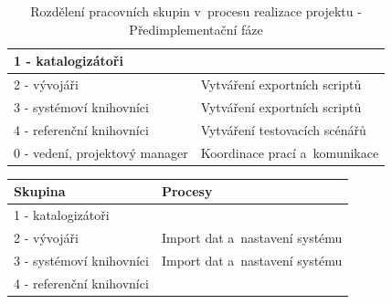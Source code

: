 \documentclass[
	11pt, oneside, printed, final, palatino, monochrome
	microtype,
	table,   %
	lof,     %
	lot     %
]{fithesis3}
\newcommand{\bold}[1]{\textbf{#1}}
\begin{document}
{\begin{table}
\begin{tabular}{| p{3cm} | p{8.3cm} |}
	1 - katalogizátoři
    & 
    
    \\ \hline
    
	2 - vývojáři
    & 
    Vytváření exportních scriptů
    \\ \hline
    
	3 - systémoví knihovníci
    & 
    Vytváření exportních scriptů
    \\ \hline
    
	4 - referenční knihovníci
    & 
    Vytváření testovacích scénářů
    \\ \hline
    
	0 - vedení, projektový manager
    & 
    Koordinace prací a~komunikace
    \\ \hline
    
    \end{tabular}
    \caption{Rozdělení pracovních skupin v~procesu realizace projektu - Předimplementační fáze}
\end{table}
    
\begin{table}
    \centering
    \begin{tabular}{| p{3cm} | p{8.3cm} |}
    \hline
    \bold{Skupina} 	
    & 
    \bold{Procesy} 
    \\ \hline
    
	1 - katalogizátoři
    & 
    
    \\ \hline
    
	2 - vývojáři
    & 
    Import dat a~nastavení systému
    \\ \hline
    
	3 - systémoví knihovníci
    & 
    Import dat a~nastavení systému
    \\ \hline
    
	4 - referenční knihovníci
    & 
    
    \\ \hline
    

\end{tabular}
\end{table}}
\end{document}
